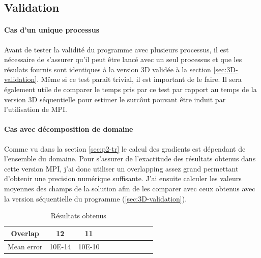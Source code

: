 
\subsection{Validation}

\paragraph{Cas d'un unique processus}Avant de tester la validité du programme avec plusieurs processus, il est nécessaire de s'assurer qu'il peut être lancé avec un seul processus et que les résulats fournis sont identiques à la version 3D validée à la section \ref{sec:3D-validation}. Même si ce test paraît trivial, il est important de le faire. Il sera également utile de comparer le temps pris par ce test par rapport au temps de la version 3D séquentielle pour estimer le surcôut pouvant être induit par l'utilisation de MPI.

\paragraph{Cas avec décomposition de domaine}
Comme vu dans la section \ref{sec:p2-tr} le calcul des gradients est dépendant de l'ensemble du domaine. Pour s'assurer de l'exactitude des résultats obtenus dans cette version MPI, j'ai donc utiliser un overlapping assez grand permettant d'obtenir une precision numérique suffisante. J'ai ensuite calculer les valeurs moyennes des champs de la solution afin de les comparer avec ceux obtenus avec la version séquentielle du programme (\ref{sec:3D-validation}).

\begin{table}[h]
  \begin{center}
    \begin{tabular}{|c|c|c||c|c|c|c||c|c|c|}
      \hline
      Overlap & 12 & 11 \\
      \hline
      Mean error & 10E-14 & 10E-10 \\
      \hline
    
    \end{tabular}
    \caption{\label{arr:overlap_res} Résultats obtenus}
  \end{center}
\end{table}
